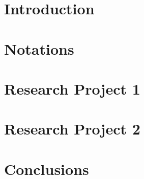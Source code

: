 \documentclass[12pt,twoside]{report}
\begin{document}
\thesis %
\newpage


\chapter{Introduction}


\chapter{Notations}


\chapter{Research Project 1}


\chapter{Research Project 2}


\chapter{Conclusions}


\newpage
{}





\newpage
{}

\end{document}
